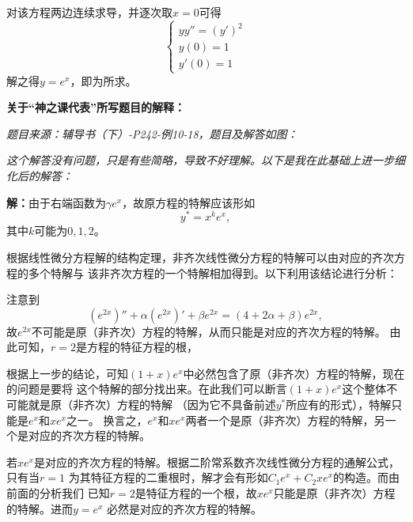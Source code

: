 对该方程两边连续求导，并逐次取$x=0$可得
$$\left\{\begin{array}{l}
yy''=(y')^2\\
y(0)=1\\
y'(0)=1
\end{array}\right.$$
解之得$y=e^x$，即为所求。


\ifvisible

	\newpage
	
	{\bf 关于“神之课代表”所写题目的解释：}
	
	{\it 题目来源：辅导书（下）-P242-例10-18，题目及解答如图：}
	
	\begin{center}
	\end{center}
	
	{\it 这个解答没有问题，只是有些简略，导致不好理解。以下是我在此基础上进一步细化后的解答：}
	
	{\bf 解：}由于右端函数为$\gamma e^x$，故原方程的特解应该形如
	$$y^*=x^ke^x,$$
	其中$k$可能为$0,1,2$。
	
	根据线性微分方程解的结构定理，非齐次线性微分方程的特解可以由对应的齐次方程的多个特解与
	该非齐次方程的一个特解相加得到。以下利用该结论进行分析：
	
	注意到
	$$(e^{2x})''+\alpha(e^{2x})'+\beta e^{2x}
	=(4+2\alpha+\beta)e^{2x},$$
	故$e^{2x}$不可能是原（非齐次）方程的特解，从而只能是对应的齐次方程的特解。
	由此可知，$r=2$是方程的特征方程的根，
	
	根据上一步的结论，可知$(1+x)e^x$中必然包含了原（非齐次）方程的特解，现在的问题是要将
	这个特解的部分找出来。在此我们可以断言$(1+x)e^x$这个整体不可能就是原（非齐次）方程的特解
	（因为它不具备前述$y^*$所应有的形式），特解只能是$e^x$和$xe^x$之一。
	换言之，$e^x$和$xe^x$两者一个是原（非齐次）方程的特解，另一个是对应的齐次方程的特解。
	
	若$xe^x$是对应的齐次方程的特解。根据二阶常系数齐次线性微分方程的通解公式，只有当$r=1$
	为其特征方程的二重根时，解才会有形如$C_1e^x+C_2xe^x$的构造。而由前面的分析我们
	已知$r=2$是特征方程的一个根，故$xe^x$只能是原（非齐次）方程的特解。进而$y=e^x$
	必然是对应的齐次方程的特解。
	
